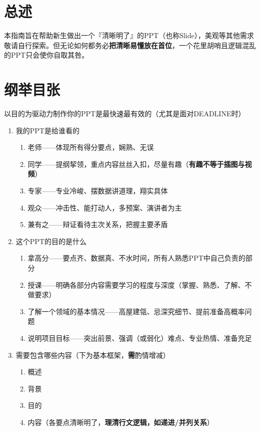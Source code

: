 \part[总述]{总述}
本指南旨在帮助新生做出一个『清晰明了』的PPT（也称Slide），美观等其他需求敬请自行探索。但无论如何都务必\textbf{把清晰易懂放在首位}，一个花里胡哨且逻辑混乱的PPT只会使你自取其咎。

\part[纲举目张]{纲举目张}
以目的为驱动力制作你的PPT是最快速最有效的（尤其是面对DEADLINE时）
\begin{enumerate}
    \item 我的PPT是给谁看的
          \begin{enumerate}
              \item 老师——体现所有得分要点，娴熟、无误
              \item 同学——提纲挈领，重点内容丝丝入扣，尽量有趣（\textbf{有趣不等于插图与视频}）
              \item 专家——专业冷峻、摆数据讲道理，翔实具体
              \item 观众——冲击性、能打动人，多预案、演讲者为主
              \item 兼有之——辩证看待主次关系，把握主要矛盾
          \end{enumerate}
    \item 这个PPT的目的是什么
          \begin{enumerate}
              \item 拿高分——要点齐、数据真、不水时间，所有人熟悉PPT中自己负责的部分
              \item 授课——明确各部分内容需要学习的程度与深度（掌握、熟悉、了解、不做要求）
              \item 了解一个领域的基本情况——高屋建瓴、忌深究细节、提前准备高概率问题
              \item 说明项目目标——突出前景、强调（或弱化）难点、专业热情、准备充足
          \end{enumerate}
    \item 需要包含哪些内容（下为基本框架，\textbf{需}酌情增减）
          \begin{enumerate}
              \item 概述
              \item 背景
              \item 目的
              \item 内容（各要点清晰明了，\textbf{理清行文逻辑，如递进/并列关系}）

\end{enumerate}
\end{enumerate}
